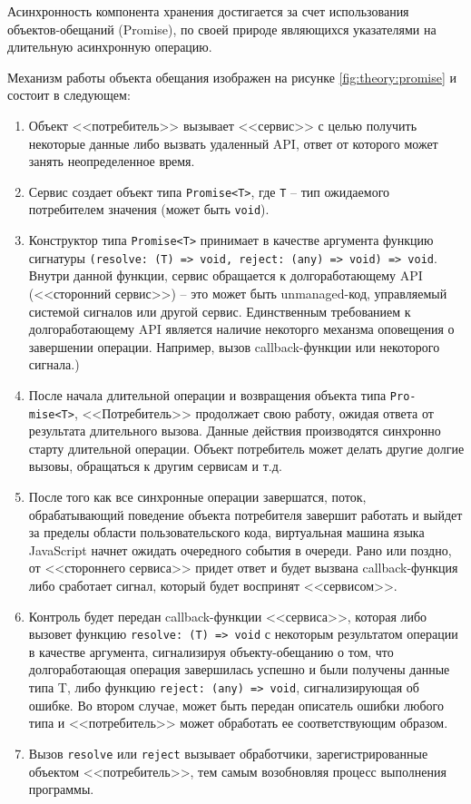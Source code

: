 
Асинхронность компонента хранения достигается за счет использования объектов-обещаний (Promise), по своей природе являющихся указателями на длительную асинхронную операцию. 

Механизм работы объекта обещания изображен на рисунке \ref{fig:theory:promise} и состоит в следующем:

\begin{enumerate}[label=\arabic*.]
\item{Объект <<потребитель>> вызывает <<сервис>> с целью получить некоторые данные либо вызвать удаленный API, ответ от которого может занять неопределенное время.}
\item{Сервис создает объект типа \texttt{Promise<T>}, где \texttt{T} -- тип ожидаемого потребителем значения (может быть \texttt{void}).}
\item{Конструктор типа \texttt{Promise<T>} принимает в качестве аргумента функцию сигнатуры \texttt{(resolve: (T) => void, reject: (any) => void) => void}. Внутри данной функции, сервис
обращается к долгоработающему API (<<сторонний сервис>>) -- это может быть unmanaged-код, управляемый системой сигналов или другой сервис. Единственным требованием к долгоработающему API
является наличие некоторго механзма оповещения о завершении операции. Например, вызов callback-функции или некоторого сигнала.)}
\item{После начала длительной операции и возвращения объекта типа \texttt{Pro- mise<T>}, <<Потребитель>> продолжает свою работу, ожидая ответа от результата длительного вызова. Данные
действия производятся синхронно старту длительной операции. Объект потребитель может делать другие долгие вызовы, обращаться к другим сервисам и т.д.}
\item{После того как все синхронные операции завершатся, поток, обрабатывающий поведение объекта потребителя завершит работать и выйдет за пределы области пользовательского кода,
виртуальная машина языка JavaScript начнет ожидать очередного события в очереди. Рано или поздно, от <<стороннего сервиса>> придет ответ и будет вызвана callback-функция либо сработает
сигнал, который будет воспринят <<сервисом>>.}
\item{Контроль будет передан callback-функции <<сервиса>>, которая либо вызовет функцию \texttt{resolve: (T) => void} с некоторым результатом операции в качестве аргумента,
сигнализируя объекту-обещанию о том, что долгоработающая операция завершилась успешно и были получены данные типа T, либо функцию \texttt{reject: (any) => void}, сигнализирующая
об ошибке. Во втором случае, может быть передан описатель ошибки любого типа и <<потребитель>> может обработать ее соответствующим образом.}
\item{Вызов \texttt{resolve} или \texttt{reject} вызывает обработчики, зарегистрированные объектом <<потребитель>>, тем самым возобновляя процесс выполнения программы.}
\end{enumerate}

